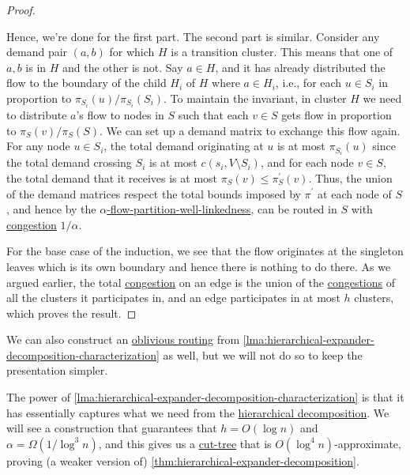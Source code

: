 \begin{proof}
\begin{explanation}
	\end{explanation}
	Hence, we're done for the first part. The second part is similar. Consider any demand pair \((a, b)\) for which \(H\) is a transition cluster. This means that one of \(a, b\) is in \(H\) and the other is not. Say \(a \in H\), and it has already distributed the flow to the boundary of the child \(H_i\) of \(H\) where \(a \in H_i\), i.e., for each \(u \in S_i\) in proportion to \(\pi _{S_i}(u) / \pi _{S_i}(S_i)\). To maintain the invariant, in cluster \(H\) we need to distribute \(a\)'s flow to nodes in \(S\) such that each \(v \in S\) gets flow in proportion to \(\pi _S(v) / \pi _S(S)\). We can set up a demand matrix to exchange this flow again. For any node \(u \in S_i\), the total demand originating at \(u\) is at most \(\pi _{S_i}(u)\) since the total demand crossing \(S_i\) is at most \(c(s_i, V\setminus S_i)\), and for each node \(v \in S\), the total demand that it receives is at most \(\pi _S(v) \leq \pi _S^{\prime} (v)\). Thus, the union of the demand matrices respect the total bounds imposed by \(\pi ^{\prime} \) at each node of \(S\), and hence by the \hyperref[def:partition-and-boundary-well-linked]{\(\alpha \)-flow-partition-well-linkedness}, can be routed in \(S\) with \hyperref[def:congestion]{congestion} \(1 / \alpha \).

	For the base case of the induction, we see that the flow originates at the singleton leaves which is its own boundary and hence there is nothing to do there. As we argued earlier, the total \hyperref[def:congestion]{congestion} on an edge is the union of the \hyperref[def:congestion]{congestions} of all the clusters it participates in, and an edge participates in at most \(h\) clusters, which proves the result.
\end{proof}

\begin{remark}
	We can also construct an \hyperref[def:oblivious-routing-scheme]{oblivious routing} from \autoref{lma:hierarchical-expander-decomposition-characterization} as well, but we will not do so to keep the presentation simpler.
\end{remark}

The power of \autoref{lma:hierarchical-expander-decomposition-characterization} is that it has essentially captures what we need from the \hyperref[def:hierarchical-decomposition]{hierarchical decomposition}. We will see a construction that guarantees that \(h = O(\log n)\) and \(\alpha = \Omega (1 / \log ^3 n)\), and this gives us a \hyperref[def:cut-tree]{cut-tree} that is \(O(\log ^4 n)\)-approximate, proving (a weaker version of) \autoref{thm:hierarchical-expander-decomposition}.